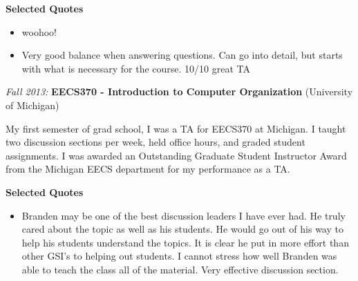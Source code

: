 \documentclass[11pt]{article} %
\begin{document}
\hspace{\leftmargin}\textbf{Selected Quotes}
\begin{itemize}[noitemsep]
  \item woohoo!
  \item Very good balance when answering questions. Can go into detail, but starts with what is necessary for the course. 10/10 great TA
\end{itemize}


\bigskip
{\large \textit{Fall 2013:} \textbf{EECS370 - Introduction to Computer Organization} (University of Michigan)}

My first semester of grad school, I was a TA for EECS370 at Michigan.
%
I taught two discussion sections per week, held office hours, and graded
student assignments.
%
I was awarded an Outstanding Graduate Student Instructor Award from the
Michigan EECS department for my performance as a TA.

\hspace{\leftmargin}\textbf{Selected Quotes}
\begin{itemize}[noitemsep]
  \item Branden may be one of the best discussion leaders I have ever had. He truly cared about the topic as well as his students. He would go out of his way to help his students understand the topics. It is clear he put in more effort than other GSI's to helping out students. I cannot stress how well Branden was able to teach the class all of the material. Very effective discussion section.
\end{itemize}
\end{document}
